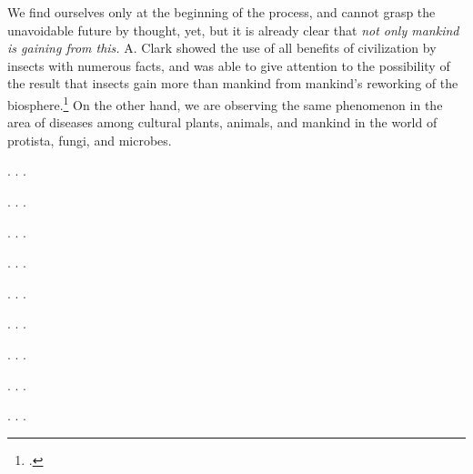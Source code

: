 We find ourselves only at the beginning of the process, and cannot grasp the
unavoidable future by thought, yet, but it is already clear that \emph{not only
mankind is gaining from this.}  A. Clark showed the use of all benefits of
civilization by insects with numerous facts, and was able to give attention to
the possibility of the result that insects gain more than mankind from
mankind's reworking of the biosphere.\footcite{clark1930evolution}  On the
other hand, we are observing the same phenomenon in the area of diseases among
cultural plants, animals, and mankind in the world of protista, fungi, and
microbes.


\Section %

. . .

\Section %

. . .

\Section %

. . .

\Section %

. . .

\Section %

. . .

\Section %

. . .

\Section %

. . .

\Section %

. . .

\Section %

. . .
